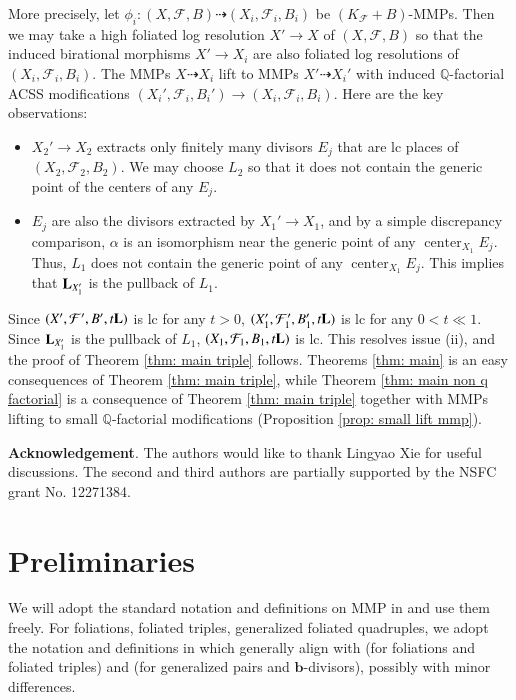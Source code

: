 \documentclass[preprint,12pt]{elsarticle}
\newcommand{\bb}{\bm{b}}
\newcommand{\Qq}{\mathbb{Q}}
\newcommand{\Center}{\operatorname{center}}
\newcommand{\Ff}{\mathcal{F}}
\newcommand{\Ll}{{\bf{L}}}
\begin{document}
More precisely, let $\phi_i: (X,\Ff,B)\dashrightarrow (X_i,\Ff_i,B_i)$ be $(K_{\Ff}+B)$-MMPs. Then we may take a high foliated log resolution $X'\rightarrow X$ of $(X,\Ff,B)$ so that the induced birational morphisms $X'\rightarrow X_i$ are also foliated log resolutions of $(X_i,\Ff_i,B_i)$. The MMPs $X\dashrightarrow X_i$ lift to MMPs $X'\dashrightarrow X_i'$ with induced $\Qq$-factorial ACSS modifications $(X_i',\Ff_i,B_i')\rightarrow (X_i,\Ff_i,B_i)$. Here are the key observations: \begin{itemize} \item $X_2'\rightarrow X_2$ extracts only finitely many divisors $E_j$ that are lc places of $(X_2,\Ff_2,B_2)$. We may choose $L_2$ so that it does not contain the generic point of the centers of any $E_j$.
\item $E_j$ are also the divisors extracted by $X_1'\rightarrow X_1$, and by a simple discrepancy comparison, $\alpha$ is an isomorphism near the generic point of any $\Center_{X_1}E_j$. Thus, $L_1$ does not contain the generic point of any $\Center_{X_1}E_j$. This implies that $\Ll_{X_1'}$ is the pullback of $L_1$.
\end{itemize}
Since $(X',\Ff',B',t\Ll)$ is lc for any $t>0$, $(X_1',\Ff_1',B_1',t\Ll)$ is lc for any $0<t\ll 1$. Since $\Ll_{X_1'}$ is the pullback of $L_1$, $(X_1,\Ff_1,B_1,t\Ll)$ is lc. This resolves issue (ii), and the proof of Theorem \ref{thm: main triple} follows. Theorems \ref{thm: main} is an easy consequences of Theorem \ref{thm: main triple}, while Theorem \ref{thm: main non q factorial} is a consequence of  Theorem \ref{thm: main triple} together with MMPs lifting to small $\Qq$-factorial modifications (Proposition \ref{prop: small lift mmp}).



\medskip

\noindent\textbf{Acknowledgement}. The authors would like to thank Lingyao Xie for useful discussions. The second and third authors are partially supported by the NSFC grant No. 12271384.

\section{Preliminaries}\label{sec: preliminaries}

We will adopt the standard notation and definitions on MMP in \cite{KM98,BCHM10} and use them freely. For foliations, foliated triples, generalized foliated quadruples, we adopt the notation and definitions in \cite{LLM23,CHLX23} which generally align with \cite{CS20, ACSS21, CS21} (for foliations and foliated triples) and \cite{BZ16,HL23} (for generalized pairs and $\bb$-divisors), possibly with minor differences. 
\end{document}
